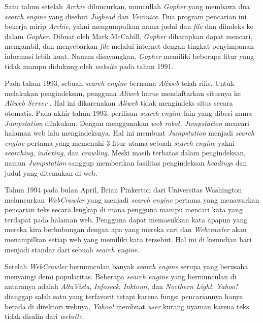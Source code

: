 Satu tahun setelah \textit{Archie} diluncurkan, muncullah \textit{Gopher} yang membawa dua  \textit{search engine} yang disebut \textit{Jughead} dan \textit{Veronice}. Dua program pencarian ini bekerja mirip \textit{Archie}, yakni mengumpulkan nama judul dan \textit{file} dan diindeks ke dalam \textit{Gopher}. Dibuat oleh Mark McCahill, \textit{Gopher} diharapkan dapat mencari, mengambil, dan menyebarkan \textit{file} melalui internet dengan tingkat penyimpanan informasi lebih kuat. Namun disayangkan, \textit{Gopher} memiliki beberapa fitur yang tidak mampu didukung oleh \textit{website} pada tahun 1991.

Pada tahun 1993, sebuah \textit{search engine} bernama \textit{Aliweb} telah rilis. Untuk melakukan pengindeksan, pengguna \textit{Aliweb} harus mendaftarkan situsnya ke \textit{Aliweb Server} \citep{seymour2011history}. Hal ini dikarenakan \textit{Aliweb} tidak mengindeks situs secara otomatis. Pada akhir tahun 1993, perilisan \textit{search engine} lain yang diberi nama \textit{Jumpstation} dilakukan. Dengan menggunakan \textit{web robot}, \textit{Jumpstation} mencari halaman web lalu mengindeksnya. Hal ini membuat \textit{Jumpstation} menjadi \textit{search engine} pertama yang memenuhi 3 fitur utama sebuah \textit{search engine} yakni \textit{searching}, \textit{indexing}, dan \textit{crawling}. Meski masih terbatas dalam pengindeksan, namun  \textit{Jumpstation} sanggup memberikan fasilitas pengindeksan \textit{headings} dan judul yang ditemukan di web.

Tahun 1994 pada bulan April, Brian Pinkerton dari Universitas Washington meluncurkan \textit{WebCrawler} yang menjadi \textit{search engine} pertama yang menawarkan pencarian teks secara lengkap di mana pengguna mampu mencari kata yang terdapat pada halaman web. Pengguna dapat memasukkan kata apapun yang mereka kira berhubungan dengan apa yang mereka cari dan \textit{Webcrawler} akan menampilkan setiap web yang memiliki kata tersebut. Hal ini di kemudian hari menjadi standar dari sebuah \textit{search engine}.

Setelah \textit{WebCrawler} bermunculan banyak \textit{search engine} serupa yang berusaha menyaingi demi popularitas. Beberapa \textit{search engine} yang bermunculan di antaranya adalah \textit{AltaVista}, \textit{Infoseek}, \textit{Inktomi}, dan \textit{Nocthern Light}. \textit{Yahoo!} dianggap salah satu yang terfavorit tetapi karena fungsi pencariannya hanya berada di direktori webnya, \textit{Yahoo!} membuat \textit{user} kurang nyaman karena teks tidak disalin dari \textit{website}.

